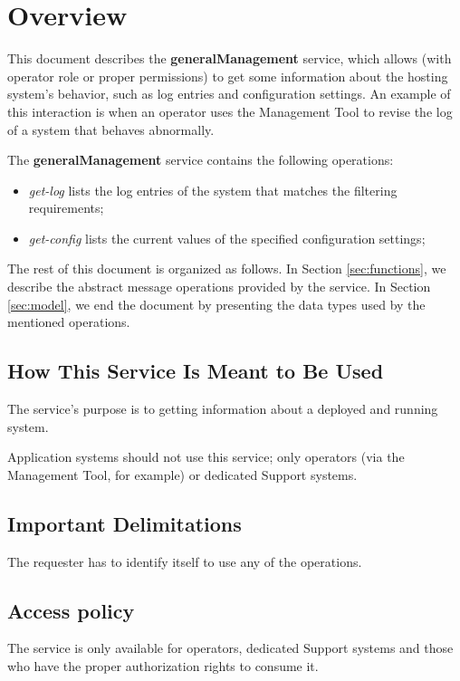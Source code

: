 \documentclass[a4paper]{arrowhead}
\begin{document}
\section{Overview}
\label{sec:overview}
This document describes the \textbf{generalManagement} service, which allows (with operator role or proper permissions) to get some information about the hosting system's behavior, such as log entries and configuration settings. An example of this interaction is when an operator uses the Management Tool to revise the log of a system that behaves abnormally.

The \textbf{generalManagement} service contains the following operations:

\begin{itemize}
    \item \textit{get-log} lists the log entries of the system that matches the filtering requirements;
    \item \textit{get-config} lists the current values of the specified configuration settings;
\end{itemize}

The rest of this document is organized as follows.
In Section \ref{sec:functions}, we describe the abstract message operations provided by the service.
In Section \ref{sec:model}, we end the document by presenting the data types used by the mentioned operations.

\subsection{How This Service Is Meant to Be Used}
The service's purpose is to getting information about a deployed and running system. 

Application systems should not use this service; only operators (via the Management Tool, for example) or dedicated Support systems.

\subsection{Important Delimitations}
\label{sec:delimitations}

The requester has to identify itself to use any of the operations.

\subsection{Access policy}
\label{sec:accesspolicy}

The service is only available for operators, dedicated Support systems and those who have the proper authorization rights to consume it.
\end{document}
